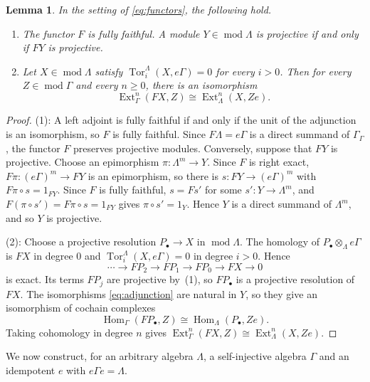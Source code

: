 \documentclass[a4paper,reqno,10pt]{amsart}
\newtheorem{lemma}[theorem]{Lemma}
\theoremstyle{definition}
\numberwithin{equation}{section}
\newcommand{\Hom}{\operatorname{Hom}}
\newcommand{\Ext}{\operatorname{Ext}}
\newcommand{\Tor}{\operatorname{Tor}}
\newcommand{\modu}{\operatorname{mod}}
\begin{document}
\begin{lemma}\label{lem:induction}
In the setting of \eqref{eq:functors}, the following hold.
\begin{enumerate}
\item The functor $F$ is fully faithful.  A module $Y\in\modu\Lambda$ is
      projective if and only if $FY$ is projective.
\item Let $X\in\modu\Lambda$ satisfy $\Tor_i^\Lambda(X,e\Gamma)=0$ for every
      $i>0$.  Then for every $Z\in\modu\Gamma$ and every $n\geq0$, there is
      an isomorphism
      \[
       \Ext_\Gamma^n(FX,Z)\cong\Ext_\Lambda^n(X,Ze).
      \]
\end{enumerate}
\end{lemma}

\begin{proof}
(1): A left adjoint is fully faithful if and only if the unit of the
adjunction is an isomorphism, so $F$ is fully faithful.  Since
$F\Lambda=e\Gamma$ is a direct summand of $\Gamma_\Gamma$, the functor $F$
preserves projective modules.  Conversely, suppose that $FY$ is projective.
Choose an epimorphism $\pi\colon\Lambda^m\to Y$.  Since $F$ is right exact,
$F\pi\colon(e\Gamma)^m\to FY$ is an epimorphism, so there is $s\colon
FY\to(e\Gamma)^m$ with $F\pi\circ s=1_{FY}$.  Since $F$ is fully faithful,
$s=Fs'$ for some $s'\colon Y\to\Lambda^m$, and $F(\pi\circ s')=F\pi\circ
s=1_{FY}$ gives $\pi\circ s'=1_Y$.  Hence $Y$ is a direct
summand of $\Lambda^m$, and so $Y$ is projective.

(2): Choose a projective resolution $P_\bullet\to X$ in $\modu\Lambda$.  The
homology of $P_\bullet\otimes_\Lambda e\Gamma$ is $FX$ in degree $0$ and
$\Tor_i^\Lambda(X,e\Gamma)=0$ in degree $i>0$.  Hence
\[
 \cdots\longrightarrow FP_2\longrightarrow FP_1
 \longrightarrow FP_0\longrightarrow FX\longrightarrow0
\]
is exact.  Its terms $FP_j$ are projective by~(1), so $FP_\bullet$ is a
projective resolution of $FX$.  The isomorphisms \eqref{eq:adjunction} are
natural in $Y$, so they give an isomorphism of cochain complexes
\[
 \Hom_\Gamma(FP_\bullet,Z)\cong\Hom_\Lambda(P_\bullet,Ze).
\]
Taking cohomology in degree $n$ gives
$\Ext_\Gamma^n(FX,Z)\cong\Ext_\Lambda^n(X,Ze)$.
\end{proof}

We now construct, for an arbitrary algebra $\Lambda$, a self-injective
algebra $\Gamma$ and an idempotent $e$ with $e\Gamma e=\Lambda$.
\end{document}
